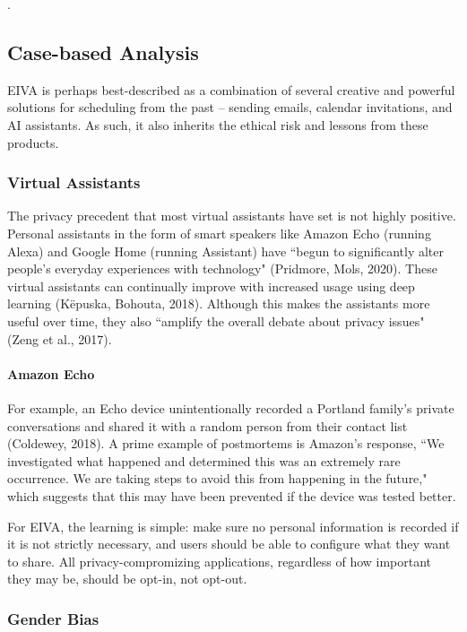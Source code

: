 \documentclass{article}
\begin{document}
.

\subsection{Case-based Analysis}

EIVA is perhaps best-described as a combination of several creative and powerful solutions for scheduling from the past -- sending emails, calendar invitations, and AI assistants. As such, it also inherits the ethical risk and lessons from these products.

\subsubsection{Virtual Assistants}

The privacy precedent that most virtual assistants have set is not highly positive. Personal assistants in the form of smart speakers like Amazon Echo (running Alexa) and Google Home (running Assistant) have ``begun to significantly alter people’s everyday experiences with technology" (Pridmore, Mols, 2020). These virtual assistants can continually improve with increased usage using deep learning (Këpuska, Bohouta, 2018). Although this makes the assistants more useful over time, they also ``amplify the overall debate about privacy issues" (Zeng et al., 2017).

\paragraph{Amazon Echo}

For example, an Echo device unintentionally recorded a Portland family's private conversations and shared it with a random person from their contact list (Coldewey, 2018). A prime example of postmortems is Amazon's response, ``We investigated what happened and determined this was an extremely rare occurrence. We are taking steps to avoid this from happening in the future," which suggests that this may have been prevented if the device was tested better.

For EIVA, the learning is simple: make sure no personal information is recorded if it is not strictly necessary, and users should be able to configure what they want to share. All privacy-compromizing applications, regardless of how important they may be, should be opt-in, not opt-out.

\subsubsection{Gender Bias}
\end{document}
